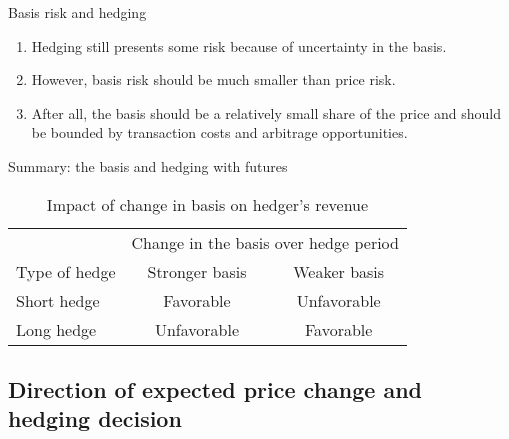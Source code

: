 \documentclass[table,xcolor=pdftex,dvipsnames]{beamer}\usepackage[]{graphicx}\usepackage[]{color}
\begin{document}

\begin{frame}{Basis risk and hedging}
\begin{enumerate}[label=\textbullet]
    \item Hedging still presents some risk because of uncertainty in the basis.
    \item However, basis risk should be much smaller than price risk.
    \item After all, the basis should be a relatively small share of the price and should be bounded by transaction costs and arbitrage opportunities.
\end{enumerate}
\end{frame}


\begin{frame}{Summary: the basis and hedging with futures}
\begin{table}
\caption{Impact of change in basis on hedger's revenue}
\begin{tabular}{l c c}
  \toprule
  & \multicolumn{2}{c}{Change in the basis over hedge period}\\
  \cmidrule(r){2-3}
  Type of hedge & Stronger basis & Weaker basis\\
  \midrule
   Short hedge & Favorable  & Unfavorable \\
   Long hedge &  Unfavorable & Favorable \\
  \bottomrule
\end{tabular}
\end{table}
\end{frame}

\subsection{Direction of expected price change and hedging decision}
\end{document}
